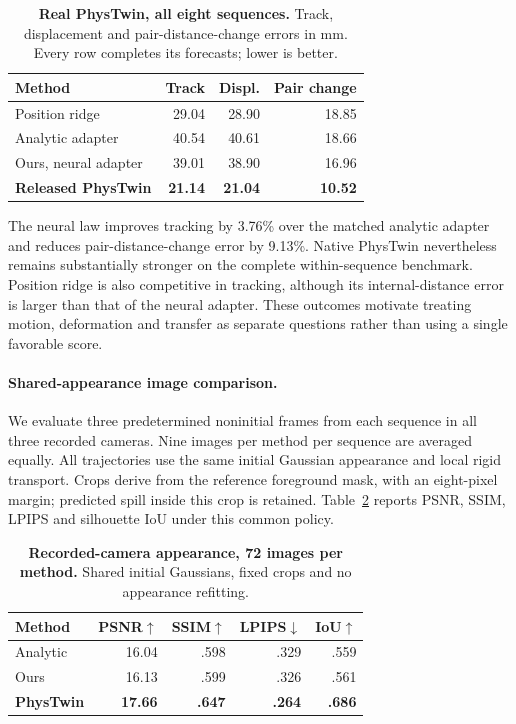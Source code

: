 \documentclass[10pt,twocolumn,letterpaper]{article}
\begin{document}
\begin{table}[h]
\centering\small\setlength{\tabcolsep}{3pt}
\caption{\textbf{Real PhysTwin, all eight sequences.} Track, displacement and pair-distance-change errors in mm. Every row completes its forecasts; lower is better.}
\label{tab:real}
\begin{tabular}{lrrr}\toprule
Method & Track & Displ. & Pair change\\\midrule
Position ridge & 29.04 & 28.90 & 18.85\\
Analytic adapter & 40.54 & 40.61 & 18.66\\
Ours, neural adapter & 39.01 & 38.90 & 16.96\\
\textbf{Released PhysTwin} & \textbf{21.14} & \textbf{21.04} & \textbf{10.52}\\\bottomrule
\end{tabular}
\end{table}

The neural law improves tracking by 3.76\% over the matched analytic adapter and reduces pair-distance-change error by 9.13\%. Native PhysTwin nevertheless remains substantially stronger on the complete within-sequence benchmark. Position ridge is also competitive in tracking, although its internal-distance error is larger than that of the neural adapter. These outcomes motivate treating motion, deformation and transfer as separate questions rather than using a single favorable score.

\paragraph{Shared-appearance image comparison.}
We evaluate three predetermined noninitial frames from each sequence in all three recorded cameras. Nine images per method per sequence are averaged equally. All trajectories use the same initial Gaussian appearance and local rigid transport. Crops derive from the reference foreground mask, with an eight-pixel margin; predicted spill inside this crop is retained. Table~\ref{tab:render} reports PSNR, SSIM, LPIPS and silhouette IoU under this common policy.

\begin{table}[h]
\centering\small\setlength{\tabcolsep}{3pt}
\caption{\textbf{Recorded-camera appearance, 72 images per method.} Shared initial Gaussians, fixed crops and no appearance refitting.}
\label{tab:render}
\begin{tabular}{lrrrr}\toprule
Method & PSNR$\uparrow$ & SSIM$\uparrow$ & LPIPS$\downarrow$ & IoU$\uparrow$\\\midrule
Analytic &16.04&.598&.329&.559\\
Ours &16.13&.599&.326&.561\\
\textbf{PhysTwin} &\textbf{17.66}&\textbf{.647}&\textbf{.264}&\textbf{.686}\\\bottomrule
\end{tabular}
\end{table}
\end{document}
